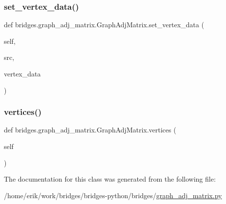 \subsubsection{\texorpdfstring{set\+\_\+vertex\+\_\+data()}{set\_vertex\_data()}}
{\footnotesize\ttfamily def bridges.\+graph\+\_\+adj\+\_\+matrix.\+Graph\+Adj\+Matrix.\+set\+\_\+vertex\+\_\+data (\begin{DoxyParamCaption}\item[{}]{self,  }\item[{}]{src,  }\item[{}]{vertex\+\_\+data }\end{DoxyParamCaption})}

\mbox{\label{classbridges_1_1graph__adj__matrix_1_1_graph_adj_matrix_a2f7f0fe4ba172afeb1dcb1afc1f6bf31}} 
\subsubsection{\texorpdfstring{vertices()}{vertices()}}
{\footnotesize\ttfamily def bridges.\+graph\+\_\+adj\+\_\+matrix.\+Graph\+Adj\+Matrix.\+vertices (\begin{DoxyParamCaption}\item[{}]{self }\end{DoxyParamCaption})}



The documentation for this class was generated from the following file\+:\begin{DoxyCompactItemize}
\item 
/home/erik/work/bridges/bridges-\/python/bridges/\hyperlink{graph__adj__matrix_8py}{graph\+\_\+adj\+\_\+matrix.\+py}\end{DoxyCompactItemize}
